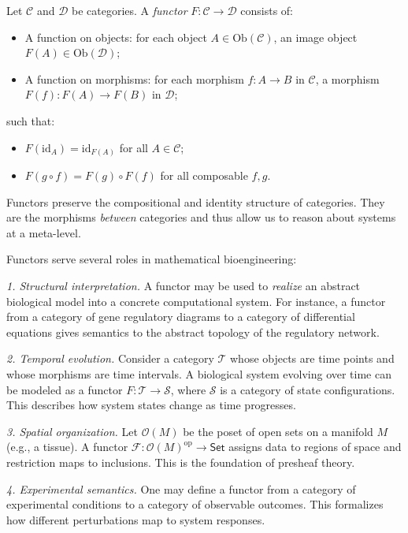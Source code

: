 \begin{definition}
Let $\mathcal{C}$ and $\mathcal{D}$ be categories. A \emph{functor} $F : \mathcal{C} \to \mathcal{D}$ consists of:
\begin{itemize}
  \item A function on objects: for each object $A \in \mathrm{Ob}(\mathcal{C})$, an image object $F(A) \in \mathrm{Ob}(\mathcal{D})$;
  \item A function on morphisms: for each morphism $f : A \to B$ in $\mathcal{C}$, a morphism $F(f) : F(A) \to F(B)$ in $\mathcal{D}$;
\end{itemize}
such that:
\begin{itemize}
  \item $F(\mathrm{id}_A) = \mathrm{id}_{F(A)}$ for all $A \in \mathcal{C}$;
  \item $F(g \circ f) = F(g) \circ F(f)$ for all composable $f, g$.
\end{itemize}
\end{definition}

Functors preserve the compositional and identity structure of categories. They are the morphisms \emph{between} categories and thus allow us to reason about systems at a meta-level.

Functors serve several roles in mathematical bioengineering:

{\it 1. Structural interpretation.} A functor may be used to \emph{realize} an abstract biological model into a concrete computational system. For instance, a functor from a category of gene regulatory diagrams to a category of differential equations gives semantics to the abstract topology of the regulatory network.

{\it 2. Temporal evolution.} Consider a category $\mathcal{T}$ whose objects are time points and whose morphisms are time intervals. A biological system evolving over time can be modeled as a functor $F : \mathcal{T} \to \mathcal{S}$, where $\mathcal{S}$ is a category of state configurations. This describes how system states change as time progresses.

{\it 3. Spatial organization.} Let $\mathcal{O}(M)$ be the poset of open sets on a manifold $M$ (e.g., a tissue). A functor $\mathscr{F} : \mathcal{O}(M)^{\mathrm{op}} \to \textsf{Set}$ assigns data to regions of space and restriction maps to inclusions. This is the foundation of presheaf theory.

{\it 4. Experimental semantics.} One may define a functor from a category of experimental conditions to a category of observable outcomes. This formalizes how different perturbations map to system responses.


